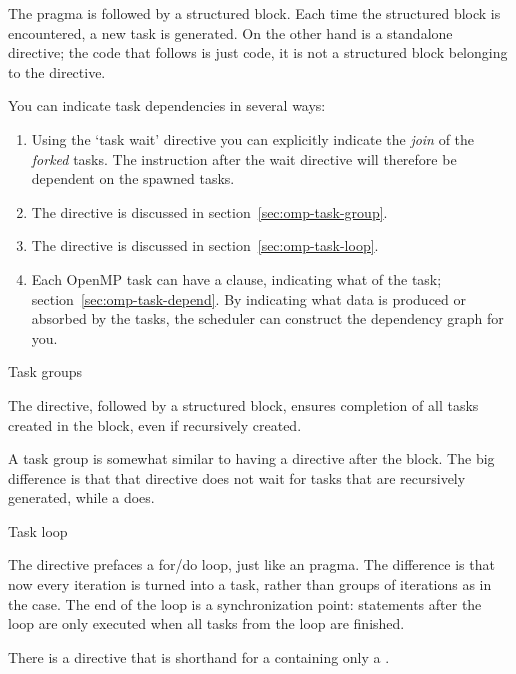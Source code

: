The  pragma is followed by a structured block.
Each time the structured block is encountered, a new task is generated.
On the other hand  is a standalone directive; 
the code that follows is just code, it is not a structured block belonging
to the directive.

You can indicate task dependencies in several ways:
\begin{enumerate}
\item Using the `task wait' directive you can explicitly indicate
  the \emph{join} of the
  \emph{forked} tasks. The instruction after the wait directive
  will therefore be dependent on the spawned tasks.
\item The  directive is discussed
  in section~\ref{sec:omp-task-group}.
\item The  directive is discussed
  in section~\ref{sec:omp-task-loop}.
\item Each OpenMP task can have a 
  clause, indicating what  of the task;
  section~\ref{sec:omp-task-depend}.
  By indicating what data is produced or absorbed by the tasks,
  the scheduler can construct the dependency graph for you.
\end{enumerate}


 {Task groups}
\label{sec:omp-task-group}

The  directive, followed
by a structured block, ensures completion of all tasks
created in the block, even if recursively created.

A task group is somewhat similar to having a 
directive after the block. The big difference is that that
 directive does not wait for tasks that are recursively
generated, while a  does.

 {Task loop}
\label{sec:omp-task-loop}

The  directive
prefaces a for/do loop, just like an  pragma.
The difference is that now every iteration is turned into a task,
rather than groups of iterations as in the  case.
The end of the loop is a synchronization point:
statements after the loop are only executed
when all tasks from the loop are finished.

There is a  directive
that is shorthand for a 
containing only a .

